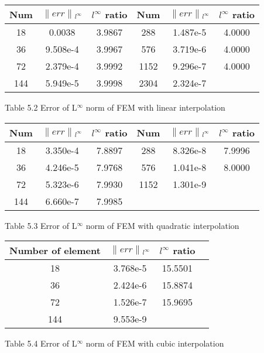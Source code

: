 \documentclass[journal]{IEEEtran}
\begin{document}
\begin{center}
	\centering
	\begin{tabular}{| c | c| c | c | c | c |}
		\hline
		Num	& $\lVert err \lVert$$_{l^\infty}$ & ${l^\infty}$ ratio&  Num	& $\lVert err \lVert$$_{l^\infty}$ & ${l^\infty}$ ratio \\ \hline
		18 & 0.0038 & 3.9867 & 288 & 1.487e-5 & 4.0000\\ \hline
		36 & 9.508e-4 & 3.9967 & 576 & 3.719e-6 & 4.0000 \\ \hline
		72 & 2.379e-4 & 3.9992 & 1152 & 9.296e-7 & 4.0000 \\ \hline
		144 & 5.949e-5 & 3.9998 & 2304 & 2.324e-7 &  \\ \hline
	\end{tabular}
\end{center}
\begin{center}
	\small Table 5.2 Error of L$^\infty$ norm of FEM with linear interpolation
\end{center}

\begin{center}
	\begin{tabular}{| c | c | c | c | c | c |}
		\hline
		Num	& $\lVert err \lVert$$_{l^\infty}$ & ${l^\infty}$ ratio&  Num	& $\lVert err \lVert$$_{l^\infty}$ & ${l^\infty}$ ratio \\ \hline
		 18 & 3.350e-4 & 7.8897 & 288 & 8.326e-8 &7.9996\\ \hline
	     36 & 4.246e-5 & 7.9768 & 576 & 1.041e-8 & 8.0000 \\ \hline
		 72 & 5.323e-6 & 7.9930 & 1152 & 1.301e-9 &  \\ \hline
		 144 & 6.660e-7 & 7.9985 &   &  &  \\ \hline
	\end{tabular}
\end{center}
\begin{center}
	\small Table 5.3 Error of L$^\infty$ norm of FEM with quadratic interpolation
\end{center}


\begin{center}
	\begin{tabular}{| c | c | c | c  |}
		\hline
		Number of element	& $\lVert err \lVert$$_{l^\infty}$ & ${l^\infty}$ ratio \\ \hline
		18 & 3.768e-5 & 15.5501 \\ \hline
		36 & 2.424e-6 & 15.8874  \\ \hline
		72 & 1.526e-7 & 15.9695 \\ \hline
		144 & 9.553e-9 &  \\ \hline
	\end{tabular}
\end{center}
\begin{center}
	\small Table 5.4 Error of L$^\infty$ norm of FEM with cubic interpolation
\end{center}
\end{document}
